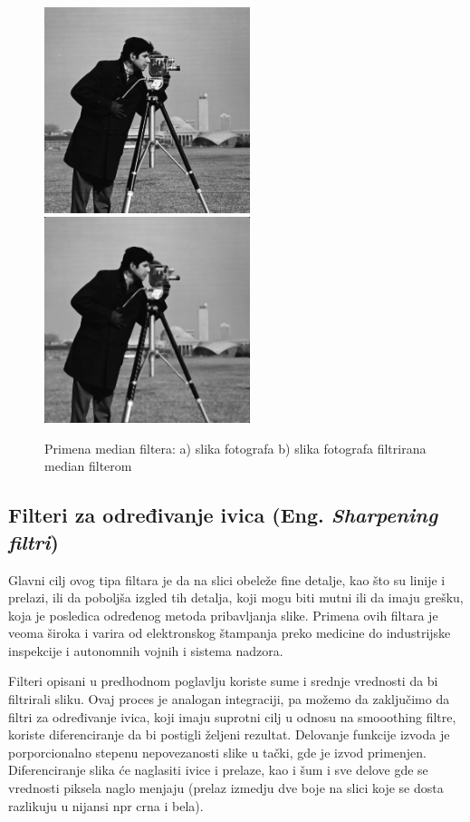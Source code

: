 \documentclass[a4paper,12pt,titlepage]{article}
\begin{document}
\begin{figure}[ht!]
\centering
\includegraphics[width=60mm]{img/img.png}
\includegraphics[width=60mm]{img/imgMed.png}
\caption{Primena median filtera: a) slika fotografa b) slika fotografa filtrirana median filterom}
\label{overflow}
\end{figure}

\subsection{Filteri za određivanje ivica (Eng. \emph{Sharpening filtri})}%

Glavni cilj ovog tipa filtara je da na slici obeleže fine detalje, kao što su linije i prelazi, ili da poboljša izgled tih detalja, koji mogu biti mutni ili da imaju grešku, koja je posledica određenog metoda pribavljanja slike. Primena ovih filtara je veoma široka i varira od elektronskog štampanja preko medicine do industrijske inspekcije i autonomnih vojnih i sistema nadzora. 

Filteri opisani u predhodnom poglavlju koriste sume i srednje vrednosti da bi filtrirali sliku. Ovaj proces je analogan integraciji, pa možemo da zaključimo da filtri za određivanje ivica, koji imaju suprotni cilj u odnosu na smooothing filtre, koriste diferenciranje da bi postigli željeni rezultat. Delovanje funkcije izvoda je porporcionalno stepenu nepovezanosti slike u tački, gde je izvod primenjen. Diferenciranje slika će naglasiti ivice i prelaze, kao i šum i sve delove gde se vrednosti piksela naglo menjaju (prelaz izmedju dve boje na slici koje se dosta razlikuju u nijansi npr crna i bela).
\end{document}
